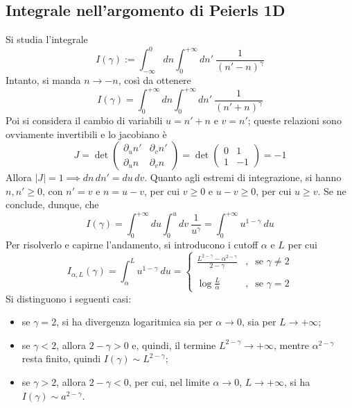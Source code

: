 \documentclass[11pt, a4paper]{scrartcl}
\theoremstyle{style}
\theoremstyle{style1}
\numberwithin{equation}{subsection}
\begin{document}
\subsection{Integrale nell'argomento di Peierls 1D}\label{peint}
Si studia l'integrale
\[
I(\gamma) := \int_{-\infty} ^0 dn \int_{0} ^{+\infty} dn' \ \frac{1}{(n'-n)^\gamma}
\] 
Intanto, si manda $n\to -n$, cos\`i da ottenere 
\[
I(\gamma) = \int_{0} ^{+\infty} dn \int_{0} ^{+\infty} dn' \ \frac{1}{(n'+n)^{\gamma}}
\] 
Poi si considera il cambio di variabili $u=n'+n$ e $v=n'$; queste relazioni sono ovviamente invertibili e lo jacobiano \`e 
\[
	J = \det \begin{pmatrix} \partial _u n' & \partial_ v n' \\ \partial _u n & \partial _v n \end{pmatrix} = \det \begin{pmatrix} 0 & 1 \\ 1 & - 1 \end{pmatrix} = -1
\] 
Allora $\lvert J \rvert =1 \implies dn\, dn' = du\, dv$.
Quanto agli estremi di integrazione, si hanno $n,n'\ge 0$, con $n'=v$ e $n=u-v$, per cui $v\ge 0$ e $u-v\ge 0$, per cui $u\ge v$.
Se ne conclude, dunque, che
\[
I(\gamma) = \int_{0} ^{+\infty}du \int_{0} ^u dv \ \frac{1}{u^{\gamma}} = \int_{0}^{+\infty} u ^{1- \gamma}\ du
\] 
Per risolverlo e capirne l'andamento, si introducono i cutoff $\alpha $ e $L$ per cui
\[
I_{\alpha ,L} (\gamma) = \int_{\alpha }^{L} u ^{1- \gamma}\ du = \begin{cases}
	\displaystyle \frac{L^{2-\gamma}- \alpha ^{2-\gamma}}{2-\gamma} &,\ \text{ se } \gamma\neq 2\\
	\\
	\displaystyle \log \frac{L}{\alpha } &,\ \text{ se } \gamma = 2
\end{cases}
\] 
Si distinguono i seguenti casi:
\begin{itemize}
	\item se $\gamma = 2$, si ha divergenza logaritmica sia per $\alpha \to 0$, sia per $L \to  + \infty$;
	\item se $\gamma< 2$, allora $2 - \gamma > 0$ e, quindi, il termine $L^{2-\gamma} \to  +\infty$, mentre $\alpha ^{2-\gamma}$ resta finito, quindi $I(\gamma) \sim L^{2 - \gamma}$;
	\item se $\gamma > 2$, allora $2- \gamma < 0 $, per cui, nel limite $\alpha \to 0$, $L \to +\infty$, si ha $I(\gamma) \sim a ^{2 - \gamma}$.
\end{itemize}
\end{document}
